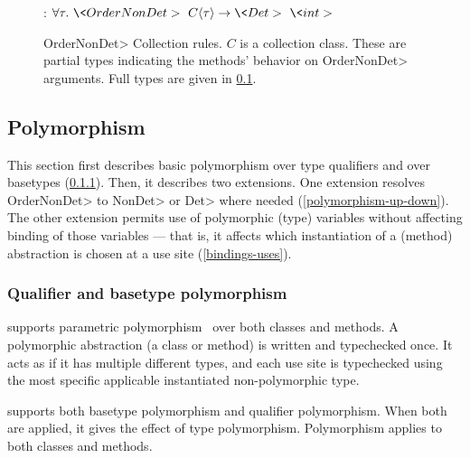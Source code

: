\begin{figure}

    :
    $
    \forallt{\tau} \<OrderNonDet>\ C\angles{\tau} \rightarrow
    \<Det> \ \<int>
    $
    
\caption{\<OrderNonDet> Collection rules.  $C$ is a collection class.
    These are partial types indicating the methods' behavior on
    \<OrderNonDet> arguments.  Full types are given in \cref{polymorphism}.}
\label{fig-ordernondet-rules}
\end{figure}

\subsection{Polymorphism}\label{polymorphism}

This section first describes basic polymorphism over type qualifiers and
over basetypes (\cref{sec:basic-polymorphism}).  Then, it describes two
extensions.
One extension resolves \<OrderNonDet> to \<NonDet> or \<Det> where
needed (\cref{polymorphism-up-down}).
The other extension permits use of polymorphic (type) variables without
affecting binding of those variables --- that is, it affects which
instantiation of a (method) abstraction is chosen at a use site
(\cref{bindings-uses}).



\subsubsection{Qualifier and basetype polymorphism}\label{sec:basic-polymorphism}

\OurTypeSystem supports parametric
polymorphism~\cite{Abadi:1989:FIM:77350.77373,Plotkin:1993:LPP:645891.671433}
over both classes and methods.
A polymorphic abstraction (a class or method) is written and
typechecked once.
It acts as if it has multiple different types, and each use site is
typechecked using the most specific applicable instantiated
non-polymorphic type.



\OurTypeSystem supports both basetype polymorphism and qualifier polymorphism.
When both are applied, it gives the effect of type polymorphism.
Polymorphism applies to both classes and methods.

